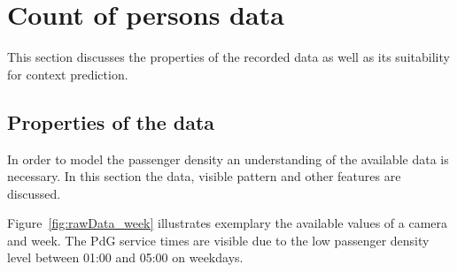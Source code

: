 \section{Count of persons data}
This section discusses the properties of the recorded data as well as its suitability for context prediction.
\subsection{Properties of the data}
\label{sec:PassengerDensityData}

In order to model the passenger density an understanding of the available data is necessary. In this section the data, visible pattern and other features are discussed.

Figure~\ref{fig:rawData_week} illustrates exemplary the available values of a camera and week. The PdG service times are visible due to the low passenger density level between 01:00 and 05:00 on weekdays.


